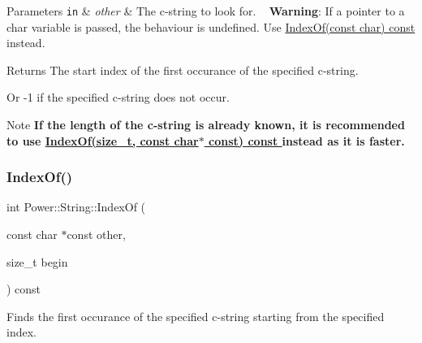 \begin{DoxyParams}[1]{Parameters}
\mbox{\tt in}  & {\em other} & The c-\/string to look for. ~\newline
 {\bfseries Warning}\+: If a pointer to a char variable is passed, the behaviour is undefined. Use \hyperlink{class_power_1_1_string_af1bd7ca5bdef376538e580fd61d7fb1d}{Index\+Of(const char) const }instead. \\
\hline
\end{DoxyParams}
\begin{DoxyReturn}{Returns}
The start index of the first occurance of the specified c-\/string. 

Or -\/1 if the specified c-\/string does not occur. 
\end{DoxyReturn}
\begin{DoxyNote}{Note}
{\bfseries If the length of the c-\/string is already known, it is recommended to use \hyperlink{class_power_1_1_string_a489427963f47ef1ab11dff53218e8fdd}{Index\+Of(size\+\_\+t, const char$\ast$ const) const }instead as it is faster.} 
\end{DoxyNote}
\mbox{\label{class_power_1_1_string_a4ddb609f41c44132b4f3214597f32011}} 
\subsubsection{\texorpdfstring{Index\+Of()}{IndexOf()}\hspace{0.1cm}{\footnotesize\ttfamily [5/12]}}
{\footnotesize\ttfamily int Power\+::\+String\+::\+Index\+Of (\begin{DoxyParamCaption}\item[{const char $\ast$const}]{other,  }\item[{size\+\_\+t}]{begin }\end{DoxyParamCaption}) const\hspace{0.3cm}{\ttfamily [inline]}}



Finds the first occurance of the specified c-\/string starting from the specified index. 


